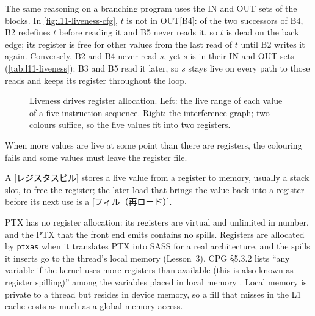 \documentclass[../main.tex]{subfiles}
\begin{document}
The same reasoning on a branching program uses the IN and OUT sets of
the blocks.  In \cref{fig:l11-liveness-cfg}, $t$ is not in OUT[B4]: of
the two successors of B4, B2 redefines $t$ before reading it and B5
never reads it, so $t$ is dead on the back edge; its register is free
for other values from the last read of $t$ until B2 writes it again.
Conversely, B2 and B4 never read $s$, yet $s$ is in their IN and OUT
sets (\cref{tab:l11-liveness}): B3 and B5 read it later, so $s$ stays
live on every path to those reads and keeps its register throughout
the loop.

\begin{figure}[tb]
  \centering
  
  \caption{Liveness drives register allocation.  Left: the live range
    of each value of a five-instruction sequence.  Right: the
    interference graph; two colours suffice, so the five values fit
    into two registers.}
  \label{fig:l11-interference}
\end{figure}

When more values are live at some point than there are registers, the
colouring fails and some values must leave the register file.

\begin{definition}
  \label{def:l11-spill}
  A [レジスタスピル] stores a live value from a
  register to memory, usually a stack slot, to free the register; the
  later load that brings the value back into a register before its next
  use is a [フィル（再ロード）].
\end{definition}

PTX has no register allocation: its registers are virtual and
unlimited in number, and the PTX that the front end emits contains no
spills.  Registers are allocated by \texttt{ptxas} when
it translates PTX into SASS for a real architecture, and the spills it
inserts go to the thread's local memory (Lesson~3).  CPG §5.3.2 lists
\enquote{any variable if the kernel uses more registers than available
(this is also known as register spilling)} among the variables placed
in local memory \cite{nvidia2024cudaguide}.  Local memory is private
to a thread but resides in device memory, so a fill that misses in the
L1 cache costs as much as a global memory access.
\end{document}
